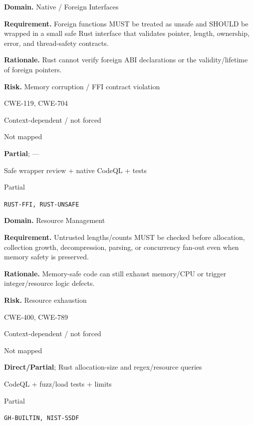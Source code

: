 \documentclass[10pt,letterpaper]{article}
\newcommand{\prioritybadge}[2]{\tcbox[on line,boxrule=0pt,arc=1.2mm,boxsep=0.7mm,left=1mm,right=1mm,top=0.4mm,bottom=0.4mm,colback=#2!12,coltext=#2]{\scriptsize\bfseries #1}}
\begin{document}
\begin{rulebox}[title={\texttt{SCS-RUST-FFI-001} \hfill \prioritybadge{Critical Control}{Critical}}]
\textbf{Domain.} Native / Foreign Interfaces

\textbf{Requirement.} Foreign functions MUST be treated as unsafe and SHOULD be wrapped in a small safe Rust interface that validates pointer, length, ownership, error, and thread-safety contracts.

\textbf{Rationale.} Rust cannot verify foreign ABI declarations or the validity/lifetime of foreign pointers.

\textbf{Risk.} Memory corruption / FFI contract violation

\begin{description}[leftmargin=2.65cm,labelwidth=2.3cm,style=nextline,itemsep=1pt,topsep=3pt]
  \item[CWE] CWE-119, CWE-704
  \item[OWASP] Context-dependent / not forced
  \item[CERT] Not mapped
  \item[CodeQL] \textbf{Partial}; ---
  \item[Enforcement] Safe wrapper review + native CodeQL + tests
  \item[Automation] Partial
  \item[Sources] \texttt{RUST-FFI, RUST-UNSAFE}
\end{description}
\end{rulebox}

\begin{rulebox}[title={\texttt{SCS-RUST-RESOURCE-001} \hfill \prioritybadge{High Priority}{High}}]
\textbf{Domain.} Resource Management

\textbf{Requirement.} Untrusted lengths/counts MUST be checked before allocation, collection growth, decompression, parsing, or concurrency fan-out even when memory safety is preserved.

\textbf{Rationale.} Memory-safe code can still exhaust memory/CPU or trigger integer/resource logic defects.

\textbf{Risk.} Resource exhaustion

\begin{description}[leftmargin=2.65cm,labelwidth=2.3cm,style=nextline,itemsep=1pt,topsep=3pt]
  \item[CWE] CWE-400, CWE-789
  \item[OWASP] Context-dependent / not forced
  \item[CERT] Not mapped
  \item[CodeQL] \textbf{Direct/Partial}; Rust allocation-size and regex/resource queries
  \item[Enforcement] CodeQL + fuzz/load tests + limits
  \item[Automation] Partial
  \item[Sources] \texttt{GH-BUILTIN, NIST-SSDF}
\end{description}
\end{rulebox}
\end{document}
